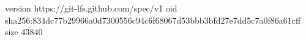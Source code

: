 version https://git-lfs.github.com/spec/v1
oid sha256:834dc77b29966a0d7300556c94c6f68067d53bbb3bfd27e7dd5c7a0f86a61cff
size 43840
